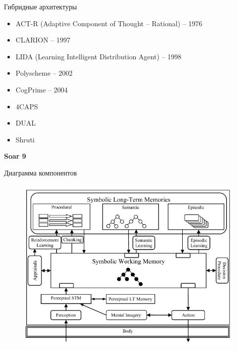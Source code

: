 \documentclass{beamer}
\begin{document}
\begin{frame}{Гибридные архитектуры}
\begin{itemize}
	\item ACT-R (Adaptive Component of Thought -- Rational) -- 1976
	\item CLARION -- 1997
	\item LIDA (Learning Intelligent Distribution Agent) -- 1998
	\item Polyscheme -- 2002
	\item CogPrime -- 2004
	\item 4CAPS
	\item DUAL
	\item Shruti
\end{itemize}
\end{frame}


%
%

\begin{frame}{}
\begin{center}
	\textbf{Soar 9}
\end{center}
\end{frame}

\begin{frame}{Диаграмма компонентов}
\begin{center}
	\begin{figure}[H]
		\includegraphics[scale=0.41]{soar9.png} 
	\end{figure}
\end{center}
\end{frame}
\end{document}
